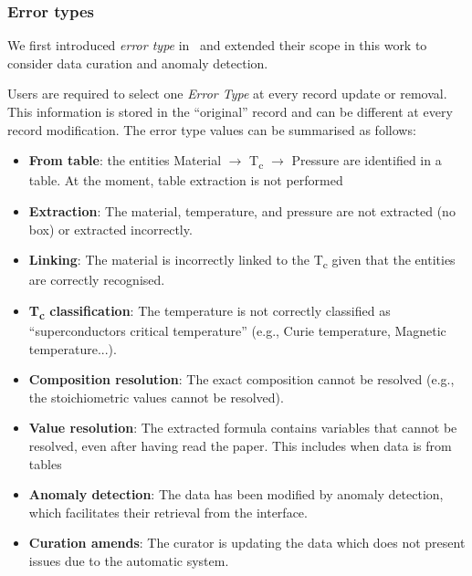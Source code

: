 \documentclass[]{interact}
\theoremstyle{plain} %
\theoremstyle{definition}
\theoremstyle{remark}
\begin{document}

\subsubsection{Error types}
\label{subsec:error-types}
We first introduced \emph{error type} in~\cite{lfoppiano2023automatic} and extended their scope in this work to consider data curation and anomaly detection. 

Users are required to select one \emph{Error Type} at every record update or removal. This information is stored in the ``original'' record and can be different at every record modification.
The error type values can be summarised as follows: 

\begin{itemize}
    \item \textbf{From table}: the entities Material $\rightarrow$ T\textsubscript{c} $\rightarrow$ Pressure are identified in a table. At the moment, table extraction is not performed
    \item \textbf{Extraction}: The material, temperature, and pressure are not extracted (no box) or extracted incorrectly. 
    \item \textbf{Linking}: The material is incorrectly linked to the T\textsubscript{c} given that the entities are correctly recognised.
    \item \textbf{T\textsubscript{c} classification}: The temperature is not correctly classified as ``superconductors critical temperature'' (e.g., Curie temperature, Magnetic temperature...).
    \item \textbf{Composition resolution}: The exact composition cannot be resolved (e.g., the stoichiometric values cannot be resolved).
    \item \textbf{Value resolution}: The extracted formula contains variables that cannot be resolved, even after having read the paper. This includes when data is from tables
    \item \textbf{Anomaly detection}: The data has been modified by anomaly detection, which facilitates their retrieval from the interface.
    \item \textbf{Curation amends}: The curator is updating the data which does not present issues due to the automatic system.
\end{itemize}
\end{document}
